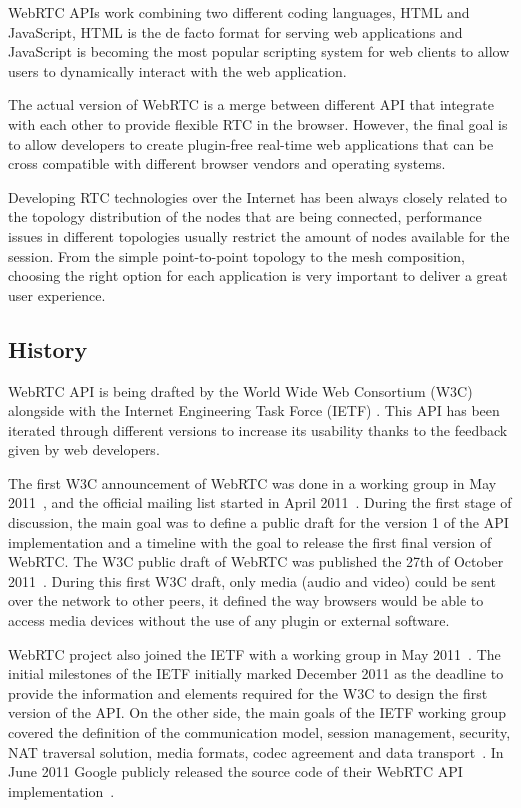 WebRTC APIs work combining two different coding languages, HTML and JavaScript, HTML is the de facto format for serving web applications and JavaScript is becoming the most popular scripting system for web clients to allow users to dynamically interact with the web application. 

The actual version of WebRTC is a merge between different API that integrate with each other to provide flexible RTC in the browser. However, the final goal is to allow developers to create plugin-free real-time web applications that can be cross compatible with different browser vendors and operating systems.

Developing RTC technologies over the Internet has been always closely related to the topology distribution of the nodes that are being connected, performance issues in different topologies usually restrict the amount of nodes available for the session. From the simple point-to-point topology to the mesh composition, choosing the right option for each application is very important to deliver a great user experience.

\subsection{History}

WebRTC API is being drafted by the World Wide Web Consortium (W3C)  alongside with the Internet Engineering Task Force (IETF) . This API has been iterated through different versions to increase its usability thanks to the feedback given by web developers.

The first W3C announcement of WebRTC was done in a working group in May 2011~\cite{webrtcW3cgroup}, and the official mailing list started in April 2011~\cite{welcomeW3C}. During the first stage of discussion, the main goal was to define a public draft for the version 1 of the API implementation and a timeline with the goal to release the first final version of WebRTC. The W3C public draft of WebRTC was published the 27th of October 2011~\cite{originalW3Cdraft}. During this first W3C draft, only media (audio and video) could be sent over the network to other peers, it defined the way browsers would be able to access media devices without the use of any plugin or external software.

WebRTC project also joined the IETF with a working group in May 2011~\cite{webrtcIETFgroup}. The initial milestones of the IETF initially marked December 2011 as the deadline to provide the information and elements required for the W3C to design the first version of the API. On the other side, the main goals of the IETF working group covered the definition of the communication model, session management, security, NAT traversal solution, media formats, codec agreement and data transport~\cite{webrtcIETFcharter}. In June 2011 Google publicly released the source code of their WebRTC API implementation~\cite{haraldpublicWebRTC}. 

